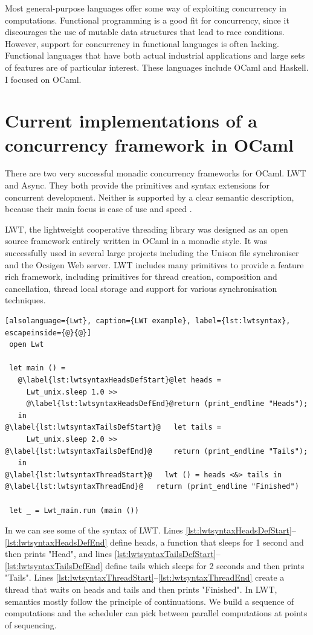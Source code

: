 \documentclass[12pt,twoside,notitlepage]{report}
\begin{document}
Most general-purpose languages offer some way of exploiting concurrency in computations. Functional programming is a good fit for concurrency, since it discourages the use of mutable data structures that lead to race conditions.  However, support for concurrency in functional languages is often lacking. Functional languages that have both actual industrial applications and large sets of features are of particular interest. These languages include OCaml and Haskell. I focused on OCaml. 
 

\section{Current implementations of a concurrency framework in OCaml}
There are two very successful monadic concurrency frameworks for OCaml. LWT\cite{LWT} and Async\cite{Async}. They both provide the primitives and syntax extensions for concurrent development. Neither is supported by a clear semantic description, because their main focus is ease of use and speed . 

LWT, the lightweight cooperative threading library\cite{vouillon2008lwt} was designed as an open source framework entirely written in OCaml in a monadic style. It was successfully used in several large projects including the Unison file synchroniser and the Ocsigen Web server. LWT includes many primitives to provide a feature rich framework, including primitives for thread creation, composition and cancellation, thread local storage and support for various synchronisation techniques. 


\begin{minipage}{\linewidth}
\begin{lstlisting}[alsolanguage={Lwt}, caption={LWT example}, label={lst:lwtsyntax}, escapeinside={@}{@}]
 open Lwt
 
 let main () =
   @\label{lst:lwtsyntaxHeadsDefStart}@let heads =
     Lwt_unix.sleep 1.0 >>
     @\label{lst:lwtsyntaxHeadsDefEnd}@return (print_endline "Heads");
   in
@\label{lst:lwtsyntaxTailsDefStart}@   let tails =
     Lwt_unix.sleep 2.0 >>
@\label{lst:lwtsyntaxTailsDefEnd}@     return (print_endline "Tails");
   in
@\label{lst:lwtsyntaxThreadStart}@   lwt () = heads <&> tails in
@\label{lst:lwtsyntaxThreadEnd}@   return (print_endline "Finished")
 
 let _ = Lwt_main.run (main ())
\end{lstlisting}
\end{minipage}


In  we can see some of the syntax of LWT. Lines \ref{lst:lwtsyntaxHeadsDefStart}--\ref{lst:lwtsyntaxHeadsDefEnd} define heads, a function that sleeps for 1 second and then prints "Head", and lines \ref{lst:lwtsyntaxTailsDefStart}--\ref{lst:lwtsyntaxTailsDefEnd} define tails which sleeps for 2 seconds and then prints "Tails".  Lines \ref{lst:lwtsyntaxThreadStart}--\ref{lst:lwtsyntaxThreadEnd} create a thread that waits on heads and tails and then prints "Finished".  In LWT, semantics mostly follow the principle of continuations. We build a sequence of computations and the scheduler can pick between parallel computations at points of sequencing.
\end{document}
